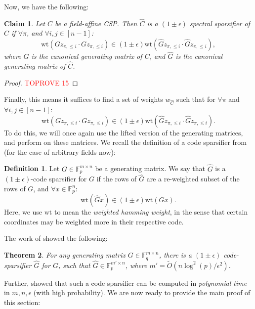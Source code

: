 \documentclass[11pt]{article}
\newtheorem{theorem}{Theorem}[section]
\newtheorem{claim}[theorem]{Claim}
\theoremstyle{definition}
\newtheorem{definition}{Definition}[section]
\newcommand{\F}{\mathbb{F}}
\newcommand{\eps}{\epsilon}
\newcommand{\wt}{\mathrm{wt}}
\begin{document}
Now, we have the following:

\begin{claim}\label{clm:preserveAndWeightsGeneral}
	Let $C$ be a field-affine CSP. Then $\hat{C}$ is a $(1 \pm \eps)$ spectral sparsifier of $C$ if $\forall \pi$, and $\forall i, j \in [n-1]$:
	\[
	\wt(Gz_{\pi, \leq i} \cdot Gz_{\pi, \leq i}) \in (1 \pm \eps) \wt(\hat{G}z_{\pi, \leq i} \cdot \hat{G}z_{\pi, \leq i}),
	\]
	where $G$ is the canonical generating matrix of $C$, and $\hat{G}$ is the canonical generating matrix of $\hat{C}$.
\end{claim}

\begin{proof}\textcolor{red}{TOPROVE 15}\end{proof}

Finally, this means it suffices to find a set of weights $w_{\hat{C}}$ such that for $\forall \pi$ and $\forall i, j \in [n-1]$:
\[
\wt(Gz_{\pi, \leq i} \cdot Gz_{\pi, \leq i}) \in (1 \pm \eps) \wt(\hat{G}z_{\pi, \leq i} \cdot \hat{G}z_{\pi, \leq i}).
\]
To do this, we will once again use the lifted version of the generating matrices, and perform  on these matrices. We recall the definition of a code sparsifier from \cite{KPS24} (for the case of arbitrary fields now):

\begin{definition}
	Let $G \in \F_p^{m \times n}$ be a generating matrix. We say that $\hat{G}$ is a $(1 \pm \eps)$-code sparsifier for $G$ if the rows of $\hat{G}$ are a re-weighted subset of the rows of $G$, and $\forall x \in \F_p^n$:
	\[
	\wt(\hat{G}x) \in (1 \pm \eps) \wt(Gx).
	\]
	Here, we use $\wt$ to mean the \emph{weighted hamming weight}, in the sense that certain coordinates may be weighted more in their respective code. 
\end{definition}

The work of \cite{KPS24} showed the following:

\begin{theorem}\cite{KPS24}\label{thm:codeSparsificationGeneral}
	For any generating matrix $G \in \F_q^{m \times n}$, there is a $(1 \pm \eps)$ code-sparsifier $\hat{G}$ for $G$, such that $\hat{G} \in \F_p^{m' \times n}$, where $m' = \widetilde{O}(n \log^2(p)/ \eps^2)$.
\end{theorem}

Further, \cite{KPS24c} showed that such a code sparsifier can be computed in \emph{polynomial time} in $m, n, \eps$ (with high probability). We are now ready to provide the main proof of this section:
\end{document}
